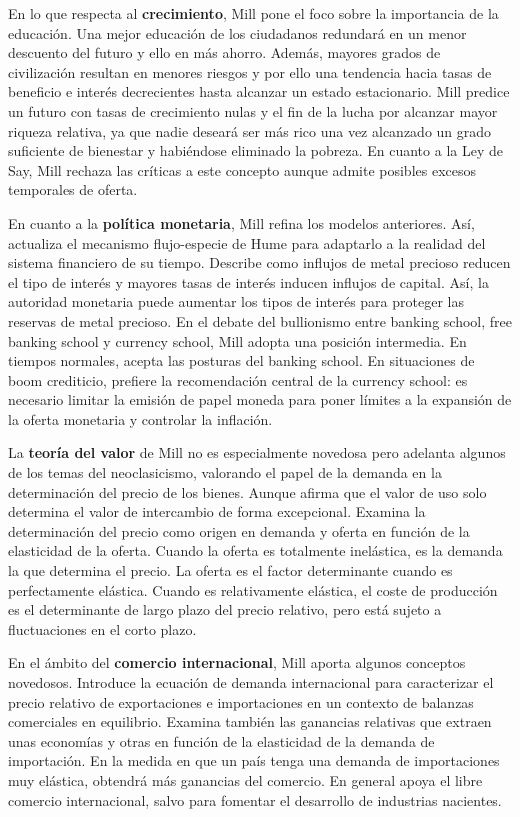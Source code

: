 \documentclass{nuevotema}
\begin{document}
En lo que respecta al \textbf{crecimiento}, Mill pone el foco sobre la importancia de la educación. Una mejor educación de los ciudadanos redundará en un menor descuento del futuro y ello en más ahorro. Además, mayores grados de civilización resultan en menores riesgos y por ello una tendencia hacia tasas de beneficio e interés decrecientes hasta alcanzar un estado estacionario. Mill predice un futuro con tasas de crecimiento nulas y el fin de la lucha por alcanzar mayor riqueza relativa, ya que nadie deseará ser más rico una vez alcanzado un grado suficiente de bienestar y habiéndose eliminado la pobreza. En cuanto a la Ley de Say, Mill rechaza las críticas a este concepto aunque admite posibles excesos temporales de oferta.

En cuanto a la \textbf{política monetaria}, Mill refina los modelos anteriores. Así, actualiza el mecanismo flujo-especie de Hume para adaptarlo a la realidad del sistema financiero de su tiempo. Describe como influjos de metal precioso reducen el tipo de interés y mayores tasas de interés inducen influjos de capital. Así, la autoridad monetaria puede aumentar los tipos de interés para proteger las reservas de metal precioso.  En el debate del bullionismo entre banking school, free banking school y currency school, Mill adopta una posición intermedia. En tiempos normales, acepta las posturas del banking school. En situaciones de boom crediticio, prefiere la recomendación central de la currency school: es necesario limitar la emisión de papel moneda para poner límites a la expansión de la oferta monetaria y controlar la inflación.

La \textbf{teoría del valor} de Mill no es especialmente novedosa pero adelanta algunos de los temas del neoclasicismo, valorando el papel de la demanda en la determinación del precio de los bienes. Aunque afirma que el valor de uso solo determina el valor de intercambio de forma excepcional. Examina la determinación del precio como origen en demanda y oferta en función de la elasticidad de la oferta. Cuando la oferta es totalmente inelástica, es la demanda la que determina el precio. La oferta es el factor determinante cuando es perfectamente elástica. Cuando es relativamente elástica, el coste de producción es el determinante de largo plazo del precio relativo, pero está sujeto a fluctuaciones en el corto plazo.

En el ámbito del \textbf{comercio internacional}, Mill aporta algunos conceptos novedosos. Introduce la ecuación de demanda internacional para caracterizar el precio relativo de exportaciones e importaciones en un contexto de balanzas comerciales en equilibrio. Examina también las ganancias relativas que extraen unas economías y otras en función de la elasticidad de la demanda de importación. En la medida en que un país tenga una demanda de importaciones muy elástica, obtendrá más ganancias del comercio. En general apoya el libre comercio internacional, salvo para fomentar el desarrollo de industrias nacientes.
\end{document}
